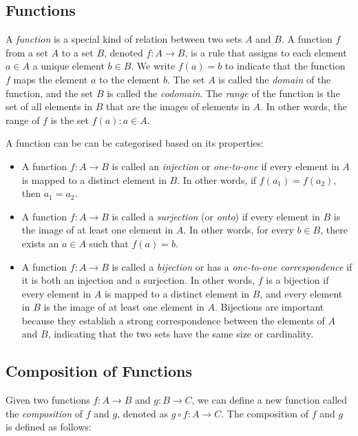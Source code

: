 \subsection{Functions}

A \textit{function} is a special kind of relation between two sets $A$ and $B$. A function $f$ from a set $A$ to a set $B$, denoted $f : A \to B$, is a rule that assigns to each element $a \in A$ a unique element $b \in B$. We write $f(a) = b$ to indicate that the function $f$ maps the element $a$ to the element $b$. The set $A$ is called the \textit{domain} of the function, and the set $B$ is called the \textit{codomain}. The \textit{range} of the function is the set of all elements in $B$ that are the images of elements in $A$. In other words, the range of $f$ is the set ${f(a) : a \in A}$.

A function can be can be categorised based on its properties:

\begin{itemize}
    \item A function $f : A \to B$ is called an \textit{injection} or \textit{one-to-one} if every element in $A$ is mapped to a distinct element in $B$. In other words, if $f(a_1) = f(a_2)$, then $a_1 = a_2$.

    \item A function $f : A \to B$ is called a \textit{surjection} (or \textit{onto}) if every element in $B$ is the image of at least one element in $A$. In other words, for every $b \in B$, there exists an $a \in A$ such that $f(a) = b$.

    \item A function $f : A \to B$ is called a \textit{bijection} or has a \textit{one-to-one correspondence} if it is both an injection and a surjection. In other words, $f$ is a bijection if every element in $A$ is mapped to a distinct element in $B$, and every element in $B$ is the image of at least one element in $A$. Bijections are important because they establish a strong correspondence between the elements of $A$ and $B$, indicating that the two sets have the same size or cardinality.

\end{itemize}

\subsection{Composition of Functions}

Given two functions $f : A \to B$ and $g : B \to C$, we can define a new function called the \textit{composition} of $f$ and $g$, denoted as $g \circ f : A \to C$. The composition of $f$ and $g$ is defined as follows:

